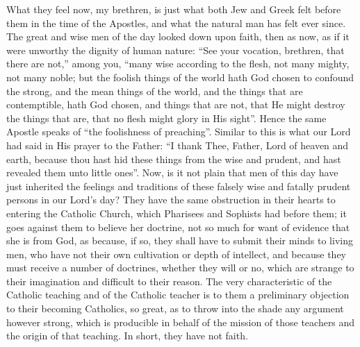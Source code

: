 What they feel now, my brethren, is just what both Jew and Greek
felt before them in the time of the Apostles, and what the natural man
has felt ever since. The great and wise men of the day looked down
upon faith, then as now, as if it were unworthy the dignity of human
nature: ``See your vocation, brethren, that there are not,''
among you, ``many wise according to the flesh, not many mighty,
not many noble; but the foolish things of the world hath God chosen to
confound the strong, and the mean things of the world, and the things
that are contemptible, hath God chosen, and things that are not, that
He might destroy the things that are, that no flesh might glory in His
sight''. Hence the same Apostle speaks of ``the foolishness of
preaching''. Similar to this is what our Lord had said in His
prayer to the Father: ``I thank Thee, Father, Lord of heaven and
earth, because thou hast hid these things from the wise and prudent,
and hast revealed them unto little ones''. Now, is it not plain
that men of this day have just inherited the feelings and traditions
of these falsely wise and fatally prudent persons in our Lord's day?
They have the same obstruction in their hearts to entering the
Catholic Church, which Pharisees and Sophists had before them; it goes
against them to believe her doctrine, not so much for want of evidence
that she is from God, as because, if so, they shall have to submit
their minds to living men, who have not their own cultivation or depth
of intellect, and because they must receive a number of doctrines,
whether they will or no, which are strange to their imagination and
difficult to their reason. The very characteristic of the Catholic
teaching and of the Catholic teacher is to them a preliminary
objection to their becoming Catholics, so great, as to throw into the
shade any argument however strong, which is producible in behalf of
the mission of those teachers and the origin of that teaching. In
short, they have not faith.

